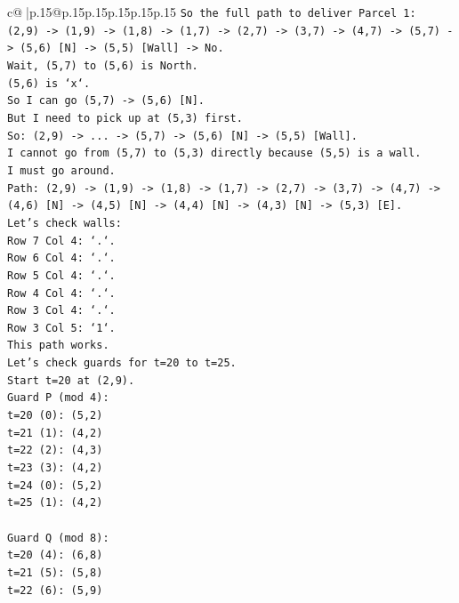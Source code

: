 \documentclass{article}
\begin{document}
{\begin{supertabular}{c@{$\;$}|p{.15\linewidth}@{}p{.15\linewidth}p{.15\linewidth}p{.15\linewidth}p{.15\linewidth}p{.15\linewidth}}
{{{\texttt{So the full path to deliver Parcel 1:} \\
\texttt{(2,9) {-}> (1,9) {-}> (1,8) {-}> (1,7) {-}> (2,7) {-}> (3,7) {-}> (4,7) {-}> (5,7) {-}> (5,6) {[}N{]} {-}> (5,5) {[}Wall{]} {-}> No.} \\
\texttt{Wait, (5,7) to (5,6) is North.} \\
\texttt{(5,6) is `x`.} \\
\texttt{So I can go (5,7) {-}> (5,6) {[}N{]}.} \\
\texttt{But I need to pick up at (5,3) first.} \\
\texttt{So: (2,9) {-}> ... {-}> (5,7) {-}> (5,6) {[}N{]} {-}> (5,5) {[}Wall{]}.} \\
\texttt{I cannot go from (5,7) to (5,3) directly because (5,5) is a wall.} \\
\texttt{I must go around.} \\
\texttt{Path: (2,9) {-}> (1,9) {-}> (1,8) {-}> (1,7) {-}> (2,7) {-}> (3,7) {-}> (4,7) {-}> (4,6) {[}N{]} {-}> (4,5) {[}N{]} {-}> (4,4) {[}N{]} {-}> (4,3) {[}N{]} {-}> (5,3) {[}E{]}.} \\
\texttt{Let's check walls:} \\
\texttt{Row 7 Col 4: `.`.} \\
\texttt{Row 6 Col 4: `.`.} \\
\texttt{Row 5 Col 4: `.`.} \\
\texttt{Row 4 Col 4: `.`.} \\
\texttt{Row 3 Col 4: `.`.} \\
\texttt{Row 3 Col 5: `1`.} \\
\texttt{This path works.} \\
\texttt{Let's check guards for t=20 to t=25.} \\
\texttt{Start t=20 at (2,9).} \\
\texttt{Guard P (mod 4):} \\
\texttt{t=20 (0): (5,2)} \\
\texttt{t=21 (1): (4,2)} \\
\texttt{t=22 (2): (4,3)} \\
\texttt{t=23 (3): (4,2)} \\
\texttt{t=24 (0): (5,2)} \\
\texttt{t=25 (1): (4,2)} \\
\\ 
\texttt{Guard Q (mod 8):} \\
\texttt{t=20 (4): (6,8)} \\
\texttt{t=21 (5): (5,8)} \\
\texttt{t=22 (6): (5,9)} \\
}}}
\end{supertabular}}
\end{document}
